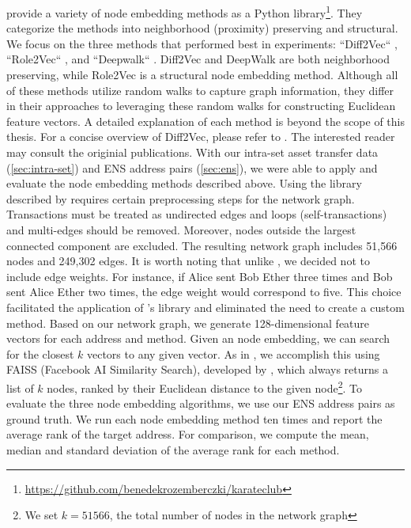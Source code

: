 \documentclass[12pt,a4paper,titlepage,oneside,english]{article}
\begin{document}
\cite{karateclub} provide a variety of node embedding methods as a Python library\footnote{\url{https://github.com/benedekrozemberczki/karateclub}}. They categorize the methods into neighborhood (proximity) preserving and structural. \newline
We focus on the three methods that performed best in \cite{Beres2020} experiments: ``Diff2Vec`` \citep{rozemberczki2020difftovec}, ``Role2Vec`` \citep{ahmed2018roletovec}, and ``Deepwalk`` \citep{perozzi2014}. Diff2Vec and DeepWalk are both neighborhood preserving, while Role2Vec is a structural node embedding method. Although all of these methods utilize random walks to capture graph information, they differ in their approaches to leveraging these random walks for constructing Euclidean feature vectors. A detailed explanation of each method is beyond the scope of this thesis. For a concise overview of Diff2Vec, please refer to \cite{wu2022tutela}. The interested reader may consult the originial publications. \newline
With our intra-set asset transfer data (\ref{sec:intra-set}) and ENS address pairs (\ref{sec:ens}), we were able to apply and evaluate the node embedding methods described above. Using the library described by \cite{karateclub} requires certain preprocessing steps for the network graph. Transactions must be treated as undirected edges and loops (self-transactions) and multi-edges should be removed. Moreover, nodes outside the largest connected component are excluded. The resulting network graph includes 51,566 nodes and 249,302 edges. \newline
It is worth noting that unlike \cite{wu2022tutela}, we decided not to include edge weights. For instance, if Alice sent Bob Ether three times and Bob sent Alice Ether two times, the edge weight would correspond to five. This choice facilitated the application of \cite{rozemberczki2020difftovec}'s library and eliminated the need to create a custom method. \newline
Based on our network graph, we generate 128-dimensional feature vectors for each address and method. \newline
Given an node embedding, we can search for the closest $k$ vectors to any given vector. As in \cite{wu2022tutela}, we accomplish this using FAISS (Facebook AI Similarity Search), developed by \cite{johnson2019faiss}, which always returns a list of $k$ nodes, ranked by their Euclidean distance to the given node\footnote{We set $k = 51566$, the total number of nodes in the network graph}. \newline
To evaluate the three node embedding algorithms, we use our ENS address pairs as ground truth. We run each node embedding method ten times and report the average rank of the target address. For comparison, we  compute the mean, median and standard deviation of the average rank for each method.
\end{document}
